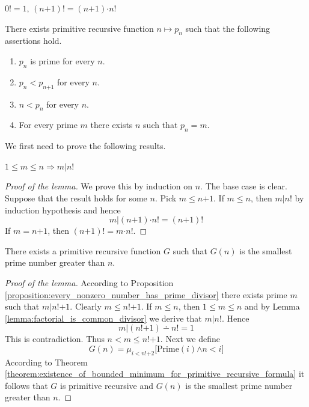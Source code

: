 \documentclass[10pt]{amsart}
\newcommand{\mra}{\boldsymbol{\Rightarrow}}
\newcommand{\mand}{\boldsymbol{\wedge}}
\newcommand{\mle}{\boldsymbol{<}}
\newcommand{\mleq}{\boldsymbol{\leq}}
\newcommand{\meq}{\boldsymbol{=}}
\newcommand{\mplus}{\boldsymbol{+}}
\newcommand{\mdot}{\boldsymbol{\cdot}}
\begin{document}
\begin{definition}
	$0! \meq 1,\,(n\mplus1)! \meq (n\mplus1)\mdot n!$
\end{definition}

\begin{theorem}\label{theorem:prime_number_sequence}
	There exists primitive recursive function $n \mapsto p_n$ such that the following assertions hold.
	\begin{enumerate}[label=\emph{\textbf{(\arabic*)}}, leftmargin=3.0em]
		\item $p_n$ is prime for every $n$.
		\item $p_n \mle p_{n\mplus1}$ for every $n$.
		\item $n \mle p_n$ for every $n$.
		\item For every prime $m$ there exists $n$ such that $p_n \meq m$.
	\end{enumerate}
\end{theorem}
\noindent
We first need to prove the following results.

\begin{lemma}\label{lemma:factorial_is_common_divisor}
	$1 \mleq m \mleq n \mra m|n!$
\end{lemma}
\begin{proof}[Proof of the lemma]
	We prove this by induction on $n$. The base case is clear. Suppose that the result holds for some $n$. Pick $m \mleq n \mplus 1$. If $m \mleq n$, then $m|n!$ by induction hypothesis and hence
	$$m|(n\mplus1)\mdot n! \meq (n\mplus1)!$$
	If $m \meq n \mplus 1$, then $(n\mplus1)! \meq m\mdot n!$.
\end{proof}

\begin{lemma}\label{lemma:prime_number_greater_than_given_number}
	There exists a primitive recursive function $G$ such that $G(n)$ is the smallest prime number greater than $n$.
\end{lemma}
\begin{proof}[Proof of the lemma]
	According to Proposition \ref{proposition:every_nonzero_number_has_prime_divisor} there exists prime $m$ such that $m|n! \mplus 1$. Clearly $m \mleq n! \mplus 1$. If $m \mleq n$, then $1\mleq m \mleq n$ and by Lemma \ref{lemma:factorial_is_common_divisor} we derive that $m|n!$. Hence
	$$m|(n! \mplus 1) \dotminus n! \meq 1$$
	This is contradiction. Thus $n \mle m \mleq n! \mplus 1$. Next we define
	$$G(n) \meq \mu_{i \mle n! \mplus 2}\big[\mathrm{Prime}(i) \mand n \mle i\big]$$
	According to Theorem \ref{theorem:existence_of_bounded_minimum_for_primitive_recursive_formula} it follows that $G$ is primitive recursive and $G(n)$ is the smallest prime number greater than $n$.
\end{proof}
\end{document}
